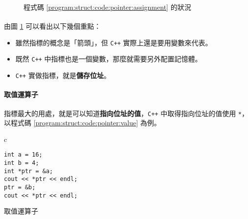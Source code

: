 \documentclass[12pt,a4paper,oneside]{article}
\begin{document}
\begin{CJK}{UTF8}{bkai}
\begin{figure}[h!]
\centering
{}
\caption{程式碼 \ref{program:struct:code:pointer:assignment} 的狀況}
\label{program:struct:fig:pointer:assignment}
\end{figure}

\paragraph{}由圖 \ref{program:struct:fig:pointer:assignment} 可以看出以下幾個重點：
\begin{itemize}
\item 雖然指標的概念是「箭頭」，但 \texttt{C++} 實際上還是要用變數來代表。
\item 既然 \texttt{C++} 中指標也是一個變數，那麼就需要另外配置記憶體。
\item \texttt{C++} 實做指標，就是{\color{blue}\textbf{儲存位址}}。
\end{itemize}

\paragraph{取值運算子}指標最大的用處，就是可以知道{\color{red}\textbf{指向位址的值}}，\texttt{C++} 中取得指向位址的值使用 \lstinline!*!，以程式碼 \ref{program:struct:code:pointer:value} 為例。

\begin{code}[h!]
\centering
\begin{tabular}{c}
\begin{lstlisting}
int a = 16;
int b = 4;
int *ptr = &a;
cout << *ptr << endl;
ptr = &b;
cout << *ptr << endl;
\end{lstlisting}
\end{tabular}
\caption{取值運算子}
\label{program:struct:code:pointer:value}
\end{code}


\end{CJK}
\end{document}
